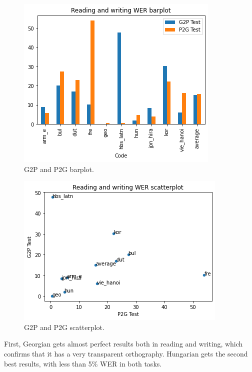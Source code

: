 \documentclass[11pt,a4paper]{article}
\begin{document}
\begin{figure}[ht]
    \centering
    \includegraphics[width=\linewidth]{g2p_p2g_barplot.png}
    \caption{G2P and P2G barplot.}
    \label{fig:g2p_p2g_barplot}
\end{figure}

\begin{figure}[ht]
    \centering
    \includegraphics[width=\linewidth]{g2p_p2g_scatterplot.png}
    \caption{G2P and P2G scatterplot.}
    \label{fig:g2p_p2g_scatterplot}
\end{figure}

First, Georgian gets almost perfect results both in reading and writing, which confirms that it has a very transparent orthography. Hungarian gets the second best results, with less than 5\% WER in both tasks.
\end{document}
